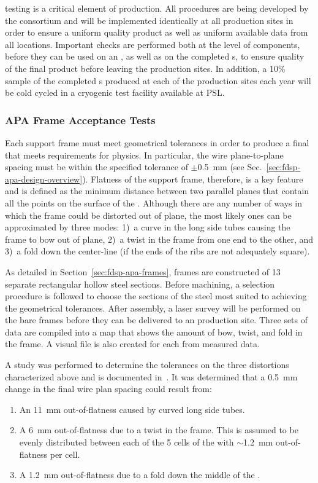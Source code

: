  testing is a critical element of  production.  All  procedures are being developed by the consortium and will be implemented identically at all production sites in order to ensure a uniform quality product as well as uniform available data from all locations.  Important  checks are performed both at the level of components, before they can be used on an , as well as on the completed s, to ensure quality of the final product before leaving the production sites.  In addition, a 10\% sample of the completed s produced at each of the production sites each year will be cold cycled in a cryogenic test facility available at PSL.

\subsubsection{APA Frame Acceptance Tests} 

Each  support frame must meet geometrical tolerances in order to produce a final  that meets requirements for physics. In particular, the wire plane-to-plane spacing must be within the specified tolerance of $\pm$\SI{0.5}{mm} (see Sec.~\ref{sec:fdsp-apa-design-overview}).  Flatness of the support frame, therefore, is a key feature and is defined as the minimum distance between two parallel planes that contain all the points on the surface of the .  Although there are any number of ways in which the frame could be distorted out of plane, the most likely ones can be approximated by three modes: 1)~a curve in the long side tubes causing the frame to bow out of plane, 2)~a twist in the frame from one end to the other, and 3)~a fold down the center-line (if the ends of the ribs are not adequately square).

As detailed in Section~\ref{sec:fdsp-apa-frames},  frames are constructed of 13 separate rectangular hollow steel sections.  Before machining, a selection procedure is followed to choose the sections of the steel most suited to achieving the geometrical tolerances.  After assembly, a laser survey will be performed on the bare frames before they can be delivered to an  production site. Three sets of data are compiled into a map that shows the amount of bow, twist, and fold in the frame. A visual file is also created for each  from measured data. 

A study was performed to determine the tolerances on the three distortions characterized above and is documented in~\cite{bib:docdb1300}.  It was determined that a \SI{0.5}{mm} change in the final wire plan spacing could result from:
\begin{enumerate}
\item An \SI{11}{mm} out-of-flatness caused by curved long side tubes.
\item A \SI{6}{mm} out-of-flatness due to a twist in the frame.  This is assumed to be evenly distributed between each of the 5 cells of the  with $\sim$\SI{1.2}{mm} out-of-flatness per cell.
\item A \SI{1.2}{mm} out-of-flatness due to a fold down the middle of the .
\end{enumerate}

